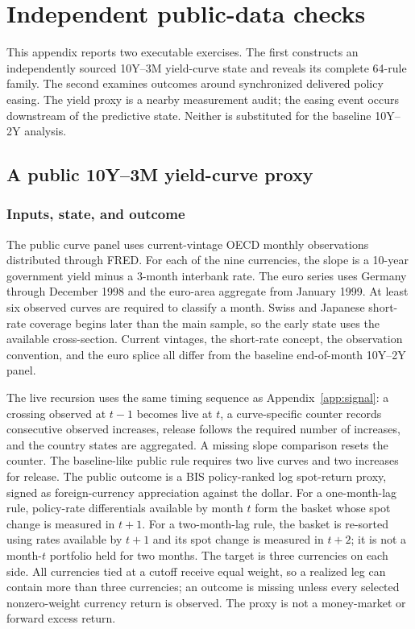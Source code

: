 \section{Independent public-data checks}
\label{app:public-checks}

This appendix reports two executable exercises. The first constructs an independently sourced 10Y--3M yield-curve state and reveals its complete 64-rule family. The second examines outcomes around synchronized delivered policy easing. The yield proxy is a nearby measurement audit; the easing event occurs downstream of the predictive state. Neither is substituted for the baseline 10Y--2Y analysis.

\subsection{A public 10Y--3M yield-curve proxy}

\subsubsection{Inputs, state, and outcome}

The public curve panel uses current-vintage OECD monthly observations distributed through FRED. For each of the nine currencies, the slope is a 10-year government yield minus a 3-month interbank rate. The euro series uses Germany through December 1998 and the euro-area aggregate from January 1999. At least six observed curves are required to classify a month. Swiss and Japanese short-rate coverage begins later than the main sample, so the early state uses the available cross-section. Current vintages, the short-rate concept, the observation convention, and the euro splice all differ from the baseline end-of-month 10Y--2Y panel.

The live recursion uses the same timing sequence as Appendix~\ref{app:signal}: a crossing observed at $t-1$ becomes live at $t$, a curve-specific counter records consecutive observed increases, release follows the required number of increases, and the country states are aggregated. A missing slope comparison resets the counter. The baseline-like public rule requires two live curves and two increases for release. The public outcome is a BIS policy-ranked log spot-return proxy, signed as foreign-currency appreciation against the dollar. For a one-month-lag rule, policy-rate differentials available by month $t$ form the basket whose spot change is measured in $t+1$. For a two-month-lag rule, the basket is re-sorted using rates available by $t+1$ and its spot change is measured in $t+2$; it is not a month-$t$ portfolio held for two months. The target is three currencies on each side. All currencies tied at a cutoff receive equal weight, so a realized leg can contain more than three currencies; an outcome is missing unless every selected nonzero-weight currency return is observed. The proxy is not a money-market or forward excess return.

